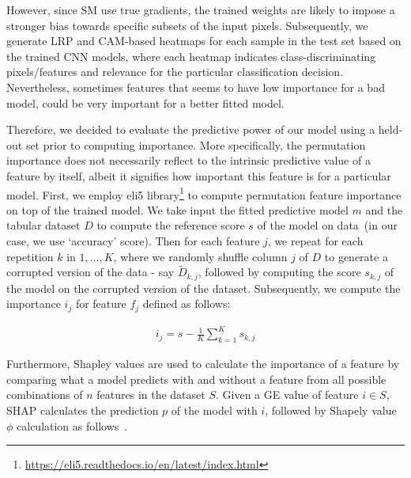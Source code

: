 
\hspace*{3.5mm} However, since SM use true gradients, the trained weights are likely to impose a stronger bias towards specific subsets of the input pixels. Subsequently, we generate LRP and CAM-based heatmaps for each sample in the test set based on the trained CNN models, where each heatmap indicates class-discriminating pixels/features and relevance for the particular classification decision. 
Nevertheless, sometimes features that seems to have low importance for a bad model, could be very important for a better fitted model. 

\hspace*{3.5mm}Therefore, we decided to evaluate the predictive power of our model using a held-out set prior to computing importance. More specifically, the permutation importance does not necessarily reflect to the intrinsic predictive value of a feature by itself, albeit it signifies how important this feature is for a particular model. First, we employ eli5 library\footnote{\url{https://eli5.readthedocs.io/en/latest/index.html}} to compute permutation feature importance on top of the trained model. We take input the fitted predictive model $m$ and the tabular dataset $D$ to compute the reference score $s$ of the model on data~(in our case, we use `accuracy' score). Then for each feature $j$, we repeat for each repetition $k$ in $1, \ldots, K$, where we randomly shuffle column $j$ of $D$ to generate a corrupted version of the data - say $\tilde{D}_{k,j}$, followed by computing the score $s_{k,j}$ of the model on the corrupted version of the dataset. Subsequently, we compute the importance $i_{j}$ for feature $f_{j}$ defined as follows:

\vspace{-2mm}
\begin{align}
    i_{j}=s-\frac{1}{K} \sum_{k=1}^{K} s_{k, j}
\end{align}

\hspace*{3.5mm} Furthermore, Shapley values are used to calculate the importance of a feature by comparing what a model predicts with and without a feature from all possible combinations of $n$ features in the dataset $S$. Given a GE value of feature $i \in S$, SHAP calculates the prediction $p$ of the model with $i$, followed by Shapely value $\phi$ calculation as follows~\cite{NIPS2017_7062}. 


